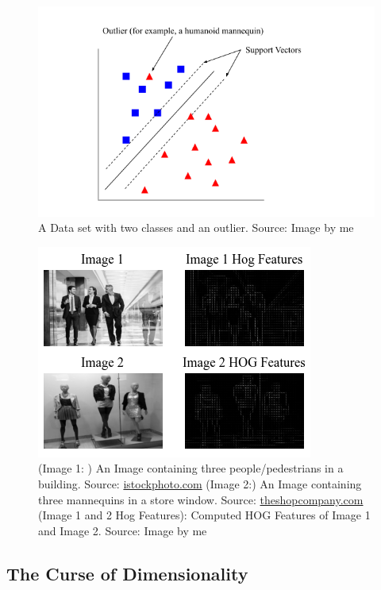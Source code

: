 \begin{figure}
    \centering
    \includegraphics[width=0.75\linewidth]{images/outliers.png}
    \caption{A Data set with two classes and an outlier. Source: Image by me}
    \label{fig:outliers}
\end{figure}

\begin{figure}
    \centering
    \includegraphics[width=0.75\linewidth]{images/features.png}
    \caption{(Image 1: ) An Image containing three people/pedestrians in a building. Source: \href{https://www.istockphoto.com/photo/business-people-taking-a-break-gm639259132-115111535}{istockphoto.com} (Image 2:) An Image containing three mannequins in a store window. Source: \href{https://theshopcompany.com/blog/Mannequins_and_Dressforms_Who_Uses_What}{theshopcompany.com} (Image 1 and 2 Hog Features): Computed HOG Features of Image 1 and Image 2. Source: Image by me}
    \label{fig:manequin_features}
\end{figure}


\subsection{The Curse of Dimensionality}\label{sec:curse_of_dimensionality}

